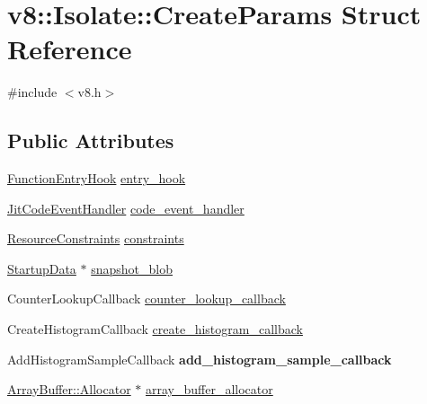 \hypertarget{structv8_1_1_isolate_1_1_create_params}{}\section{v8\+:\+:Isolate\+:\+:Create\+Params Struct Reference}
\label{structv8_1_1_isolate_1_1_create_params}


{\ttfamily \#include $<$v8.\+h$>$}

\subsection*{Public Attributes}
\begin{DoxyCompactItemize}
\item 
\hyperlink{namespacev8_aaf07fb6bb13f295da3c6568938b7dec5}{Function\+Entry\+Hook} \hyperlink{structv8_1_1_isolate_1_1_create_params_aa7aa18bbe2d86713e5b074a93b38dc60}{entry\+\_\+hook}
\item 
\hyperlink{namespacev8_a39243bc91e63d64d111452fdb98c4733}{Jit\+Code\+Event\+Handler} \hyperlink{structv8_1_1_isolate_1_1_create_params_a783e3eba90ce6e2800bdd69197bbccdd}{code\+\_\+event\+\_\+handler}
\item 
\hyperlink{classv8_1_1_resource_constraints}{Resource\+Constraints} \hyperlink{structv8_1_1_isolate_1_1_create_params_a2c570b306aa8c1c24cfe70e8eee50fa1}{constraints}
\item 
\hyperlink{classv8_1_1_startup_data}{Startup\+Data} $\ast$ \hyperlink{structv8_1_1_isolate_1_1_create_params_a25d38476e4dec79ae96c59292eee4a64}{snapshot\+\_\+blob}
\item 
Counter\+Lookup\+Callback \hyperlink{structv8_1_1_isolate_1_1_create_params_a10441abadd0b83a938303c92e7444fb6}{counter\+\_\+lookup\+\_\+callback}
\item 
Create\+Histogram\+Callback \hyperlink{structv8_1_1_isolate_1_1_create_params_a11acf5fb9cdbc4c8bf15baf542507b49}{create\+\_\+histogram\+\_\+callback}
\item 
\hypertarget{structv8_1_1_isolate_1_1_create_params_a3e0fb886996eb1f498b6cc157e11e280}{}Add\+Histogram\+Sample\+Callback {\bfseries add\+\_\+histogram\+\_\+sample\+\_\+callback}\label{structv8_1_1_isolate_1_1_create_params_a3e0fb886996eb1f498b6cc157e11e280}

\item 
\hyperlink{classv8_1_1_array_buffer_1_1_allocator}{Array\+Buffer\+::\+Allocator} $\ast$ \hyperlink{structv8_1_1_isolate_1_1_create_params_a7c663f70b64290392eeaf164f57585f9}{array\+\_\+buffer\+\_\+allocator}
\end{DoxyCompactItemize}


